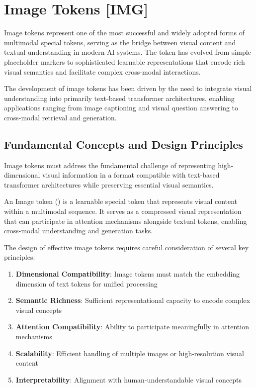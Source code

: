 
\section{Image Tokens [IMG]}

Image tokens represent one of the most successful and widely adopted forms of multimodal special tokens, serving as the bridge between visual content and textual understanding in modern AI systems. The \img{} token has evolved from simple placeholder markers to sophisticated learnable representations that encode rich visual semantics and facilitate complex cross-modal interactions.

The development of image tokens has been driven by the need to integrate visual understanding into primarily text-based transformer architectures, enabling applications ranging from image captioning and visual question answering to cross-modal retrieval and generation.

\subsection{Fundamental Concepts and Design Principles}

Image tokens must address the fundamental challenge of representing high-dimensional visual information in a format compatible with text-based transformer architectures while preserving essential visual semantics.

\begin{definition}
An Image token (\img{}) is a learnable special token that represents visual content within a multimodal sequence. It serves as a compressed visual representation that can participate in attention mechanisms alongside textual tokens, enabling cross-modal understanding and generation tasks.
\end{definition}

The design of effective image tokens requires careful consideration of several key principles:

\begin{enumerate}
\item \textbf{Dimensional Compatibility}: Image tokens must match the embedding dimension of text tokens for unified processing
\item \textbf{Semantic Richness}: Sufficient representational capacity to encode complex visual concepts
\item \textbf{Attention Compatibility}: Ability to participate meaningfully in attention mechanisms
\item \textbf{Scalability}: Efficient handling of multiple images or high-resolution visual content
\item \textbf{Interpretability}: Alignment with human-understandable visual concepts
\end{enumerate}

